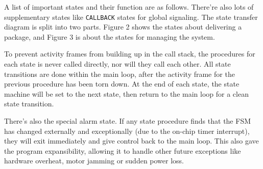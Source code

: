 \documentclass{article}
\begin{document}
\par A list of important states and their function are as follows. There're also lots of supplementary states like \texttt{CALLBACK} states for global signaling. The state transfer diagram is split into two parts. Figure 2 shows the states about delivering a package, and Figure 3 is about the states for managing the system.

\par To prevent activity frames from building up in the call stack, the procedures for each state is never called directly, nor will they call each other. All state transitions are done within the main loop, after the activity frame for the previous procedure has been torn down. At the end of each state, the state machine will be set to the next state, then return to the main loop for a clean state transition.

\par There's also the special alarm state. If any state procedure finds that the FSM has changed externally and exceptionally (due to the on-chip timer interrupt), they will exit immediately and give control back to the main loop. This also gave the program expansibility, allowing it to handle other future exceptions like hardware overheat, motor jamming or sudden power loss.
\end{document}
